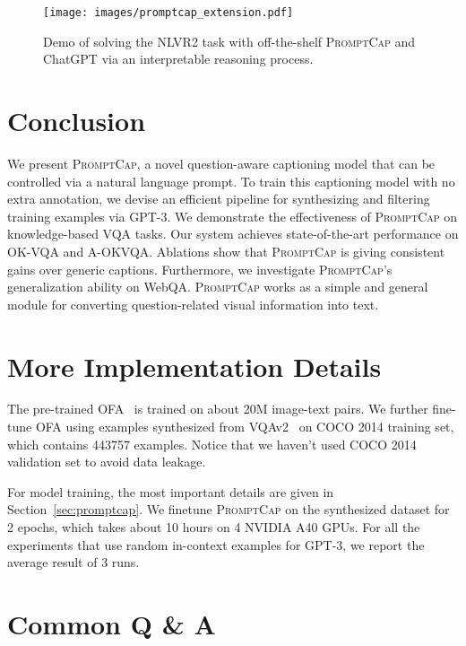 \documentclass[10pt,twocolumn,letterpaper]{article}
\newcommand{\NAME}{\textsc{PromptCap}\xspace}
\begin{document}
\begin{figure}[ht]
\centering
  \texttt{[image: images/promptcap\_extension.pdf]}
  \caption{
Demo of solving the NLVR2 task with off-the-shelf \NAME and ChatGPT via an interpretable reasoning process.
}
  \vspace{-0.1in}
  \label{fig:extension}
\end{figure} \section{Conclusion}
We present \NAME, a novel question-aware captioning model that can be controlled via a natural language prompt.
To train this captioning model with no extra annotation, we devise an efficient pipeline for synthesizing and filtering training examples via GPT-3.
We demonstrate the effectiveness of \NAME on knowledge-based VQA tasks.
Our system achieves state-of-the-art performance on OK-VQA and A-OKVQA.
Ablations show that \NAME is giving consistent gains over generic captions.
Furthermore, we investigate \NAME's generalization ability on WebQA.
\NAME works as a simple
and general module for converting question-related visual information into text.




%
 
{\small


}

\clearpage
\appendix
\section{More Implementation Details}

The pre-trained OFA~\cite{wang2022ofa} is trained on about 20M image-text pairs. We further fine-tune OFA using examples synthesized from VQAv2~\cite{goyal2017making} on COCO 2014 training set, which contains 443757 examples. Notice that we haven't used COCO 2014 validation set to avoid data leakage.

For model training, the most important details are given in Section~\ref{sec:promptcap}. 
We finetune \NAME on the synthesized dataset for 2 epochs, which takes about 10 hours on 4 NVIDIA A40 GPUs. 
For all the experiments that use random in-context examples for GPT-3, we report the average result of 3 runs.

\section{Common Q \& A}
\label{sec:appendix:qa}
\end{document}
